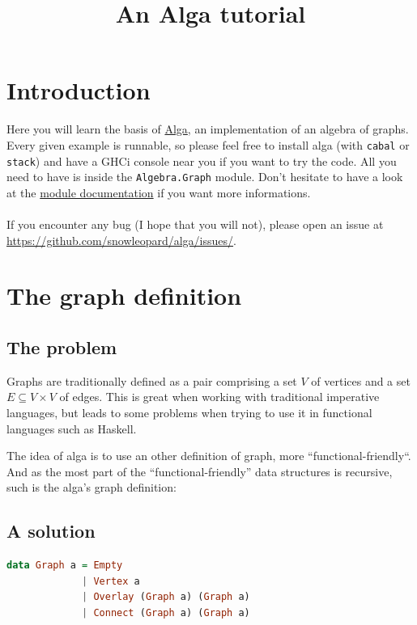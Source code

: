 \documentclass[10pt,a4paper]{article}
\title{An Alga tutorial}
\date{}
\begin{document}
\maketitle
\tableofcontents
\section{Introduction}

Here you will learn the basis of \href{http://hackage.haskell.org/package/algebraic-graphs}{Alga}, an implementation of an algebra of graphs.
Every given example is runnable, so please feel free to install alga (with \verb|cabal| or \verb|stack|) and have a GHCi console near you if you want to try the code. All you need to have is inside the \verb|Algebra.Graph| module. Don't hesitate to have a look at the \href{http://hackage.haskell.org/package/algebraic-graphs-0.1.1.1/docs/Algebra-Graph.html}{module documentation} if you want more informations.
\\
\\
If you encounter any bug (I hope that you will not), please open an issue at \url{https://github.com/snowleopard/alga/issues/}.

\section{The graph definition}
\subsection{The problem}
Graphs are traditionally defined as a pair comprising a set $V$ of vertices and a set $E \subseteq V \times V$ of edges. This is great when working with traditional imperative languages, but leads to some problems when trying to use it in functional languages such as Haskell.

The idea of alga is to use an other definition of graph, more ``functional-friendly``. And as the most part of the ``functional-friendly” data structures is recursive, such is the alga’s graph definition:

\subsection{A solution}
\begin{lstlisting}[language=Haskell, frame=single]
data Graph a = Empty
             | Vertex a
             | Overlay (Graph a) (Graph a)
             | Connect (Graph a) (Graph a)
\end{lstlisting}
\end{document}

